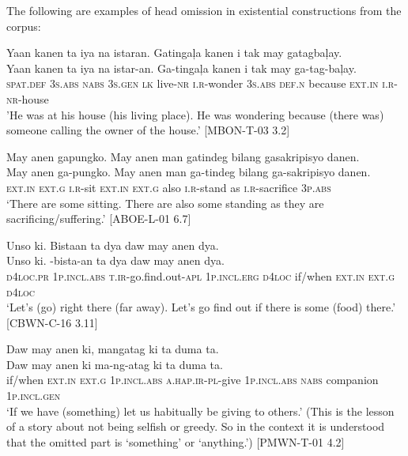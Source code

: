 The following are examples of head omission in existential constructions from the corpus:

\ea
Yaan kanen ta iya na istaran. Gatingaļa kanen i tak may gatagbaļay. \\\smallskip
\gll Yaan  kanen  ta  iya  na  istar-an.  Ga-tingaļa  kanen i tak  may  ga-tag-baļay. \\
\textsc{spat.def}  3\textsc{s.abs}  \textsc{nabs}  3\textsc{s.gen}  \textsc{lk} live-\textsc{nr}  \textsc{i.r}-wonder  3\textsc{s.abs}  \textsc{def.n}
because  \textsc{ext.in}  \textsc{i.r}-\textsc{nr}-house \\
\glt ’He was at his house (his living place). He was wondering because (there was) someone calling the owner of the house.’ [MBON-T-03 3.2]
\z

\ea
May anen gapungko. May anen man gatindeg bilang gasakripisyo danen. \\\smallskip \gll May  anen  ga-pungko.  May    anen  man  ga-tindeg  bilang ga-sakripisyo  danen. \\
\textsc{ext.in}  \textsc{ext.g}   \textsc{i.r}-sit  \textsc{ext.in}  \textsc{ext.g}  also  \textsc{i.r}-stand    as \textsc{i.r}-sacrifice  3\textsc{p.abs} \\
\glt ‘There are some sitting. There are also some standing as they are sacrificing/suffering.’ [ABOE-L-01 6.7]
\z

\ea
Unso ki. Bistaan ta dya daw may anen dya. \\\smallskip \gll Unso  ki.  \emptyset-bista-an  ta    dya  daw  may  anen dya. \\
\textsc{d}4\textsc{loc.pr}  1\textsc{p.incl.abs}  \textsc{t.ir}-go.find.out-\textsc{apl}  1\textsc{p.incl.erg}  \textsc{d}4\textsc{loc}  if/when  \textsc{ext.in}  \textsc{ext.g}
\textsc{d}4\textsc{loc} \\
\glt ‘Let’s (go) right there (far away). Let’s go find out if there is some (food) there.’ [CBWN-C-16 3.11]
\z
 
\newpage
\ea
Daw may anen ki, mangatag ki ta duma ta. \\\smallskip \gll Daw  may  anen  ki  ma-ng-atag  ki  ta  duma ta. \\
if/when  \textsc{ext.in}  \textsc{ext.g}  1\textsc{p.incl.abs}  \textsc{a.hap.ir}-\textsc{pl}-give  1\textsc{p.incl.abs}  \textsc{nabs}  companion
1\textsc{p.incl.gen} \\
\glt ‘If we have (something) let us habitually be giving to others.’ (This is the lesson of a story about not being selfish or greedy. So in the context it is understood that the omitted part is ‘something’ or ‘anything.’) [PMWN-T-01 4.2] 
\z

